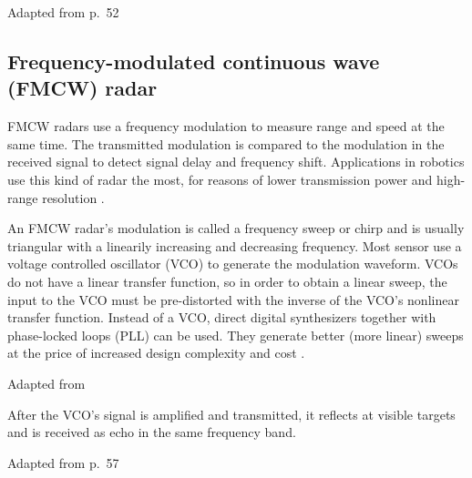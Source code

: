 %
Adapted from \cite{Adams2012} p.~52

\subsection{Frequency-modulated continuous wave (FMCW)
radar}\label{frequency-modulated-continuous-wave-fmcw-radar}

FMCW radars use a frequency modulation to measure range and speed at the
same time. The transmitted modulation is compared to the modulation in
the received signal to detect signal delay and frequency shift.
Applications in robotics use this kind of radar the most, for reasons of
lower transmission power and high-range resolution \cite{Adams2012}.

An FMCW radar's modulation is called a frequency sweep or chirp and is
usually triangular with a linearily increasing and decreasing frequency.
Most sensor use a voltage controlled oscillator (VCO) to generate the
modulation waveform. VCOs do not have a linear transfer function, so in
order to obtain a linear sweep, the input to the VCO must be
pre-distorted with the inverse of the VCO's nonlinear transfer function.
Instead of a VCO, direct digital synthesizers together with phase-locked
loops (PLL) can be used. They generate better (more linear) sweeps at
the price of increased design complexity and cost \cite{Ernst2016}.

%
Adapted from \cite{VanZeijl2014}

After the VCO's signal is amplified and transmitted, it reflects at
visible targets and is received as echo in the same frequency band.

%
Adapted from \cite{Adams2012} p.~57

